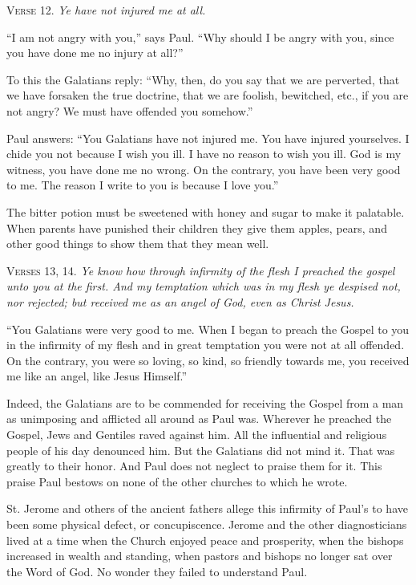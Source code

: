 \textsc{Verse} 12. \emph{Ye have not injured me at all.}

“I am not angry with you,” says Paul. “Why should I be angry with you, since you have done me no injury at all?”

To this the Galatians reply: “Why, then, do you say that we are perverted, that we have forsaken the true doctrine, that we are foolish, bewitched, etc., if you are not angry? We must have offended you somehow.”

Paul answers: “You Galatians have not injured me. You have injured yourselves. I chide you not because I wish you ill. I have no reason to wish you ill. God is my witness, you have done me no wrong. On the contrary, you have been very good to me. The reason I write to you is because I love you.”

The bitter potion must be sweetened with honey and sugar to make it palatable. When parents have punished their children they give them apples, pears, and other good things to show them that they mean well.

\textsc{Verses} 13, 14. \emph{Ye know how through infirmity of the flesh I preached the gospel unto you at the first. And my temptation which was in my flesh ye despised not, nor rejected; but received me as an angel of God, even as Christ Jesus.}

“You Galatians were very good to me. When I began to preach the Gospel to you in the infirmity of my flesh and in great temptation you were not at all offended. On the contrary, you were so loving, so kind, so friendly towards me, you received me like an angel, like Jesus Himself.”

Indeed, the Galatians are to be commended for receiving the Gospel from a man as unimposing and afflicted all around as Paul was. Wherever he preached the Gospel, Jews and Gentiles raved against him. All the influential and religious people of his day denounced him. But the Galatians did not mind it. That was greatly to their honor. And Paul does not neglect to praise them for it. This praise Paul bestows on none of the other churches to which he wrote.

St. Jerome and others of the ancient fathers allege this infirmity of Paul’s to have been some physical defect, or concupiscence. Jerome and the other diagnosticians lived at a time when the Church enjoyed peace and prosperity, when the bishops increased in wealth and standing, when pastors and bishops no longer sat over the Word of God. No wonder they failed to understand Paul.

